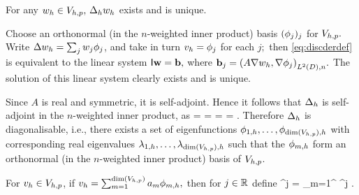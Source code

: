 \label{lem:ddwd}
For any $w_{h} \in V_{h,p},$ $\Delta_{h} w_{h}$ exists and is unique.
\ele

Choose an orthonormal (in the $n$-weighted inner product) basis  $(\phi_{j})_j$ for $V_{h,p}.$ Write $\Delta w_{h} = \sum_j w_{j} \phi_{j}$, and take in turn $v_{h} = \phi_{j}$ for each $j;$ then \cref{eq:discderdef} is equivalent to the linear system $\mathsf{I} \mathbf{w} = \mathbf{b},$ where $\bb_{j} = \IPLtDn{A \grad \wh}{\grad \phij}.$ The solution of this linear system clearly exists and is unique.
\epf


Since $A$ is real and symmetric, it is self-adjoint. Hence it follows that $\Delta_{h}$ is self-adjoint in the $n$-weighted inner product, as
\beqs
\IPLtDn{\Deltah \wh}{\vh} =  =  = \overline{\IPLtDn{\Deltah \vh}{\wh}} = \IPLtDn{\wh}{\Deltah \vh}.
\eeqs
Therefore $\Delta_{h}$ is diagonalisable, i.e., there exists a set of eigenfunctions $\phioh,\ldots,\phidimVhph$  with corresponding real eigenvalues $\lambdaoh, \ldots, \lambdadimVhph$ such that the $\phi_{m,h}$ form an orthonormal (in the $n$-weighted inner product) basis of $V_{h,p}$.

\label{def:hodd}
For $v_{h} \in V_{h,p}$, if $\vh = \sum_{m=1}^{\dimVhp} \am \phimh,$ then for $j \in \mathbb R$ define
\beqs
\Deltah^j \vh = \sum_{m=1}^{\dimVhp} \lambdamh^j \am \phimh.
\eeqs


